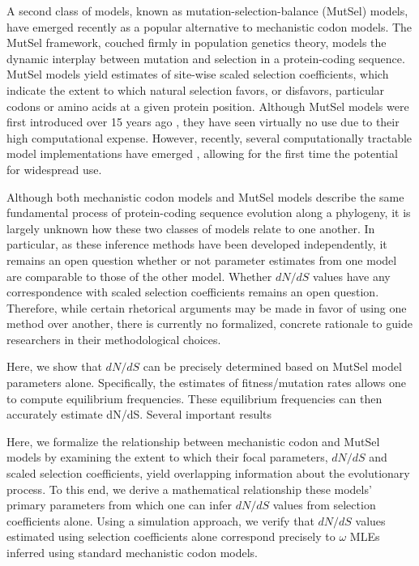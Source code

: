 \documentclass[11pt]{article}
\begin{document}
A second class of models, known as mutation-selection-balance (MutSel) models, have emerged recently as a popular alternative to mechanistic codon models. The MutSel framework, couched firmly in population genetics theory, models the dynamic interplay between mutation and selection in a protein-coding sequence. MutSel models yield estimates of site-wise scaled selection coefficients, which indicate the extent to which natural selection favors, or disfavors, particular codons or amino acids at a given protein position. Although MutSel models were first introduced over 15 years ago \cite{HalpernBruno1998}, they have seen virtually no use due to their high computational expense. However, recently, several computationally tractable model implementations have emerged \cite{RodrigueLartillot2014,Tamurietal2014}, allowing for the first time the potential for widespread use. 


Although both mechanistic codon models and MutSel models describe the same fundamental process of protein-coding sequence evolution along a phylogeny, it is largely unknown how these two classes of models relate to one another. In particular, as these inference methods have been developed independently, it remains an open question whether or not parameter estimates from one model are comparable to those of the other model. Whether $dN/dS$ values have any correspondence with scaled selection coefficients remains an open question. Therefore, while certain rhetorical arguments may be made in favor of using one method over another, there is currently no formalized, concrete rationale to guide researchers in their methodological choices. 


Here, we show that $dN/dS$ can be precisely determined based on MutSel model parameters alone. Specifically, the estimates of fitness/mutation rates allows one to compute equilibrium frequencies. 
These equilibrium frequencies can then accurately estimate dN/dS.
Several important results 


Here, we formalize the relationship between mechanistic codon and MutSel models by examining the extent to which their focal parameters, $dN/dS$ and scaled selection coefficients, yield overlapping information about the evolutionary process. To this end, we derive a mathematical relationship these models' primary parameters from which one can infer $dN/dS$ values from selection coefficients alone. Using a simulation approach, we verify that $dN/dS$ values estimated using selection coefficients alone correspond precisely to $\omega$ MLEs inferred using standard mechanistic codon models. 
\end{document}
